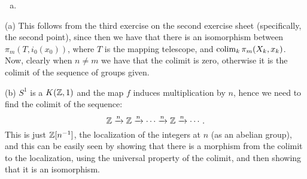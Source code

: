 \documentclass[a4paper,11pt,english]{article}
\DeclareMathOperator{\holim}{holim}
\begin{document}
\begin{exercise}[1]
\begin{enumerate}[(a)]
By the construction of the conjugation $(\omega_n)_\star$, we may defines a
homeomorphism $h_n : S^m \times [0,1] \to V$, such that $\wtil H_n = H_n' \circ
h_n$ defines a homotopy from $\xi_n$ to $p_n \circ \xi$ and $\wtil H_n(x_0,-) =
\omega_n$. 


By the exponential adjunction $\til H_n$ defines a map $\bar H_n: S^m \to
P_n^{[0,1]}$. 

By the construction of $\bar H_n$, $\bar H_n(x_0) = \omega_n$ and $\bar H_{n+1}
(x)(1) = p( \xi_{n}(x) ) = p (\bar H_n(x)(0))$, so $\bar H = (\bar H_n)_{n \ge
0}$ represent an element in $\pi_m(\holim_n P_n,\omega)$.

Also $q_n (\bar H(x)) = \bar H_n(x)(0) = \xi_n (x)$ for all $x\in S^m$, so
$\pi_m(q_n)(\bar H) = \xi$.

\item %

\end{enumerate}
\end{exercise}

\begin{exercise}[2]
(a) This follows from the third exercise on the second exercise sheet (specifically, the second point), since then we have that there is an isomorphism between $\pi_m(T,i_0(x_0))$, where $T$ is the mapping telescope, and $\operatorname{colim}_k\pi_m(X_k,x_k)$. Now, clearly when $n\ne m$ we have that the colimit is zero, otherwise it is the colimit of the sequence of groups given.

(b) $S^1$ is a $K(\mathbb{Z},1)$ and the map $f$ induces multiplication by $n$, hence we need to find the colimit of the sequence:
\[\mathbb{Z}\xrightarrow{n}\mathbb{Z}\xrightarrow{n}\cdots\xrightarrow{n}\mathbb{Z}\xrightarrow{n}\cdots.\]
This is just $\mathbb{Z}[n^{-1}]$, the localization of the integers at $n$ (as an abelian group), and this can be easily seen by showing that there is a morphism from the colimit to the localization, using the universal property of the colimit, and then showing that it is an isomorphism.
\end{exercise}
\end{document}
